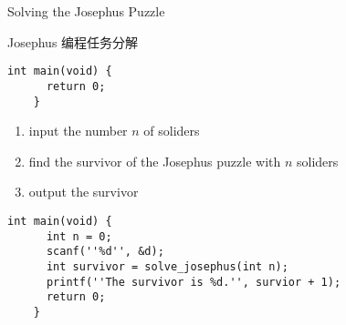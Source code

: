 \begin{frame}{}
  \centerline{\LARGE Solving the Josephus Puzzle}
\end{frame}

\begin{frame}[fragile]{Josephus 编程任务分解}



  \begin{lstlisting}[style = Cstyle]
    int main(void) {
      return 0;
    }
  \end{lstlisting}
  \vspace{0.20cm}

  {\it
    \begin{enumerate}
      \setlength{\itemsep}{6pt}
      \item input the number $n$ of soliders
      \item find the survivor of the Josephus puzzle with $n$ soliders
      \item output the survivor
    \end{enumerate}
  }

  \vspace{0.20cm}
  \pause
  \begin{lstlisting}[style = Cstyle]
    int main(void) {
      int n = 0;
      scanf(''%d'', &d);
      int survivor = solve_josephus(int n);
      printf(''The survivor is %d.'', survior + 1);
      return 0;
    }
  \end{lstlisting}
\end{frame}

